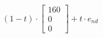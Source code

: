 \documentclass[preview]{standalone}
\begin{document}
\begin{align*}
(1- t ) \cdot \begin{bmatrix} 160 \\ 0 \\ 0 \end{bmatrix} + t \cdot e_{nd}
\end{align*}
\end{document}
